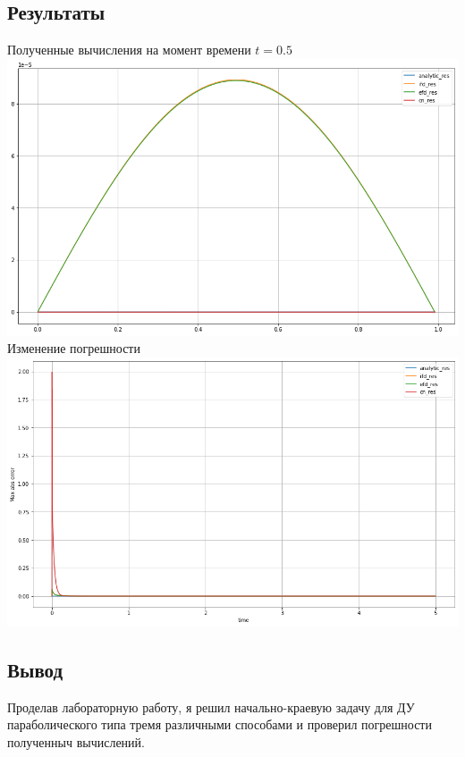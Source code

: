 \documentclass{article}
\begin{document}
\subsection*{Результаты}
\begin{center}
Полученные вычисления на момент времени $ t = 0.5 $
\\
\includegraphics[scale=0.25]{img/img01.png}
\pagebreak
\\
Изменение погрешности
\\
\includegraphics[scale=0.25]{img/img02.png}
\end{center}

\subsection*{Вывод}
Проделав лабораторную работу, я решил начально-краевую задачу для ДУ 
параболического типа тремя различными способами и проверил погрешности 
полученныч вычислений.
\end{document}
